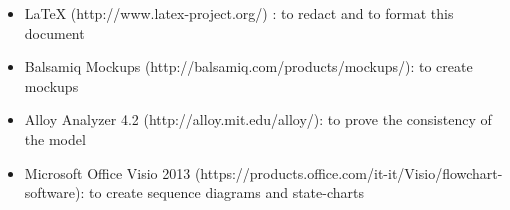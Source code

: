 \begin{itemize}
	\item LaTeX (http://www.latex-project.org/) : to redact and to format this document
	\item Balsamiq Mockups (http://balsamiq.com/products/mockups/): to create
	mockups
	\item Alloy Analyzer 4.2 (http://alloy.mit.edu/alloy/): to prove the consistency of the model
	\item Microsoft Office Visio 2013 (https://products.office.com/it-it/Visio/flowchart-software): to create sequence diagrams and state-charts
\end{itemize}